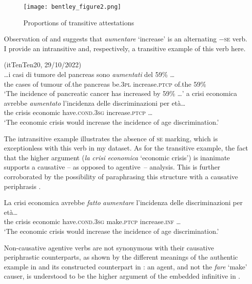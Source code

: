 \documentclass[output=paper,colorlinks,citecolor=brown
]{langscibook}
\begin{document}
\begin{figure}
\texttt{[image: bentley\_figure2.png]}
\caption{\label{fig:bentley_figure_2}Proportions of transitive attestations }
\end{figure}    

Observation of  and  suggests that \textit{aumentare} ‘increase’ is an alternating   −\textsc{se} verb. I provide an intransitive and, respectively, a transitive example of this verb here.

\ea \label{bentley_example_8}(itTenTen20, 29/10/2022)\\
    \gll  \ldots  i casi di tumore del pancreas sono \textit{aumentati} del 59\%  \ldots  \\
    the cases of tumour of.the pancreas be.3\textsc{pl} increase.\textsc{ptcp} of.the 59\% \\
    \glt ‘The incidence of pancreatic cancer has increased by 59\% \ldots ’
\ex \label{bentley_example_9}
    \gll [L]a	crisi		economica	avrebbe 							\textit{aumentato} {l’incidenza delle discriminazioni per età…} \\
    the		crisis	economic		have.\textsc{cond}.3\textsc{sg}	increase.\textsc{ptcp} \ldots \\
    \glt ‘The economic crisis would increase the incidence of age discrimination.’
\z

The intransitive example illustrates the absence of \textsc{se} marking, which is exceptionless with this verb in my dataset. As for the transitive example, the fact that the higher argument (\textit{la crisi economica} ‘economic crisis’) is inanimate supports a causative – as opposed to agentive~– analysis. This is further corroborated by the possibility of paraphrasing this structure with a causative periphrasis \citep[26--27 and references therein]{zribi1987reflexivite}.

\ea \label{bentley_example_10}
    \gll La	crisi		economica	avrebbe 							\textit{fatto} \textit{aumentare} {l’incidenza delle discriminazioni per età\ldots}\\
    				the	crisis	economic		have.\textsc{cond}.3\textsc{sg}	make.\textsc{ptcp}	increase.\textsc{inf} {\ldots} \\
    \glt  	‘The economic crisis would increase the incidence of age discrimination.’
\z

Non-causative agentive verbs are not synonymous with their causative periphrastic counterparts, as shown by the different meanings of the authentic example in  and its constructed counterpart in : an agent, and not the \textit{fare} ‘make’ causer, is understood to be the higher argument of the embedded infinitive in .
\end{document}
